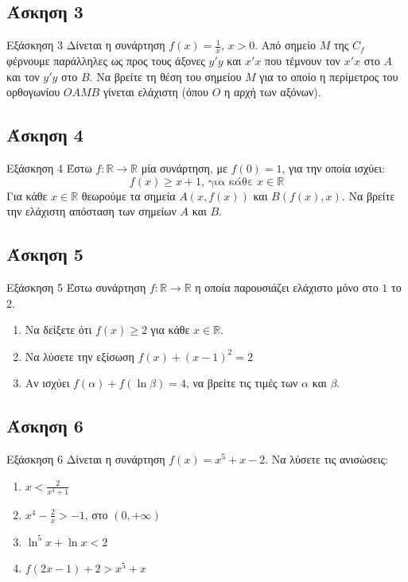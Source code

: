 \documentclass[greek]{beamer}
\begin{document}
\subsection{Άσκηση 3}
\begin{frame}[label=Άσκηση3,t]{Εξάσκηση 3}
      Δίνεται η συνάρτηση $f(x)=\frac{1}{x}$, $x>0$. Από σημείο $Μ$ της $C_f$ φέρνουμε παράλληλες ως προς τους άξονες $y'y$ και $x'x$ που τέμνουν τον $x'x$ στο $Α$ και τον $y'y$ στο $Β$. Να βρείτε τη θέση του σημείου $Μ$ για το οποίο η περίμετρος του ορθογωνίου $ΟΑΜΒ$ γίνεται ελάχιστη (όπου $Ο$ η αρχή των αξόνων).
\end{frame}

\subsection{Άσκηση 4}
\begin{frame}[label=Άσκηση4,t]{Εξάσκηση 4}
      Έστω $f:\mathbb{R}\to\mathbb{R}$ μία συνάρτηση, με $f(0)=1$, για την οποία ισχύει:
      $$f(x)\ge x+1 \text{, για κάθε } x\in\mathbb{R}$$
      Για κάθε $x\in\mathbb{R}$ θεωρούμε τα σημεία $Α(x,f(x))$ και $Β(f(x),x)$. Να βρείτε την ελάχιστη απόσταση των σημείων $Α$ και $Β$.
\end{frame}

\subsection{Άσκηση 5}
\begin{frame}[label=Άσκηση5,t]{Εξάσκηση 5}
      Έστω συνάρτηση $f:\mathbb{R}\to \mathbb{R}$ η οποία παρουσιάζει ελάχιστο μόνο στο $1$ το $2$.
      \begin{enumerate}
            \item Να δείξετε ότι $f(x)\ge 2$ για κάθε $x\in\mathbb{R}$. \pause
            \item Να λύσετε την εξίσωση $f(x)+(x-1)^2=2$ \pause
            \item Αν ισχύει $f(α)+f(\ln β)=4$, να βρείτε τις τιμές των $α$ και $β$.
      \end{enumerate}
\end{frame}

\subsection{Άσκηση 6}
\begin{frame}[label=Άσκηση6,t]{Εξάσκηση 6}
      Δίνεται η συνάρτηση $f(x)=x^5+x-2$. Να λύσετε τις ανισώσεις:
      \begin{enumerate}
            \item $x<\frac{2}{x^4+1}$ \pause
            \item $x^4-\frac{2}{x}>-1$, στο $(0,+\infty)$ \pause
            \item $\ln^5 x+\ln x<2$ \pause
            \item $f(2x-1)+2>x^5+x$
      \end{enumerate}
\end{frame}
\end{document}
